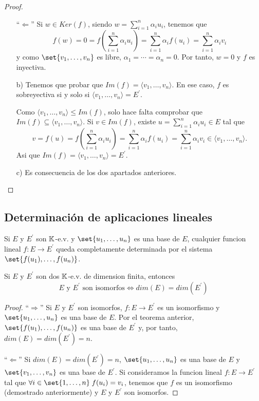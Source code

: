 \begin{proof}
\begin{enumerate}
			``\(\Leftarrow \)'' Si \(w \in Ker(f )\), siendo \(w = \sum_{i=1}^{n } \alpha_i u_i \), tenemos que
			\[
				f(w) = 0 = f(\sum_{i=1}^{n } \alpha_i u_i ) = \sum_{i=1}^{n } \alpha_i f(u_i) = \sum_{i=1}^{n } \alpha_i v_i
			\]
			y como \(\set{v_1,\ldots,v_n }\) es libre, \(\alpha_1 = \cdots = \alpha_n = 0\). Por tanto, \(w = 0 \) y \(f \) es inyectiva.
		\item[b)] Tenemos que probar que \(Im(f) = \langle v_1, \ldots, v_n \rangle \). En ese caso, \(f \) es sobreyectiva si y solo si \(\langle v_1, \ldots, v_n \rangle = E^\prime  \).

			Como \(\langle v_1, \ldots,v_n \rangle \leq Im(f )\), solo hace falta comprobar que \(Im(f) \subseteq \langle v_1, \ldots, v_n \rangle \). Si \(v \in Im(f )\), existe \(u = \sum_{i=1}^{n} \alpha_i u_i \in E \) tal que
			\[
				v = f(u) = f(\sum_{i=1}^{n } \alpha_i u_i) = \sum_{i=1}^{n } \alpha_i f(u_i) = \sum_{i=1}^{n } \alpha_i v_i \in \langle v_1, \ldots, v_n \rangle.
			\]
			Asi que \(Im(f) = \langle v_1,\ldots,v_n \rangle = E^\prime \).

		\item[c)] Es consecuencia de los dos apartados anteriores.
	\end{enumerate}
\end{proof}
\subsection{Determinación de aplicaciones lineales}
\begin{corollary}
	Si \(E \) y \(E^\prime \) son \(\mathbb{K} \)-e.v. y \(\set{u_1,\ldots,u_n} \) es una base de \(E \), cualquier funcion lineal \(f \colon E \to E^\prime \) queda completamente determinada por el sistema \(\set{f(u_1),\ldots,f(u_n )}\).
\end{corollary}

\begin{corollary}
	Si \(E \) y \(E^\prime  \) son dos \(\mathbb{K} \)-e.v. de dimension finita, entonces
	\[
		E \text{ y } E^\prime \text{ son isomorfos} \iff dim(E) = dim(E^\prime )
	\]
\end{corollary}
\begin{proof}
	``\(\Rightarrow \)'' Si \(E \) y \(E^\prime  \) son isomorfos, \(f \colon E \to E^\prime \) es un isomorfismo y \(\set{u_1,\ldots,u_n }\) es una base de \(E \). Por el teorema anterior, \(\set{f(u_1),\ldots,f(u_n )}\) es una base de \(E^\prime  \) y, por tanto, \(dim(E) = dim(E^\prime ) = n \).

	``\(\Leftarrow \)'' Si \(dim(E) = dim(E^\prime ) = n \), \(\set{u_1,\ldots,u_n }\) es una base de \(E \) y \(\set{v_1,\ldots,v_n }\) es una base de \(E^\prime \). Si consideramos la funcion lineal \(f \colon E \to E^\prime \) tal que \(\forall  i \in \set{1,\ldots,n } \; f(u_i) = v_i \), tenemos que \(f\) es un isomorfismo (demostrado anteriormente) y \(E \) y \(E^\prime  \) son isomorfos.
\end{proof}

